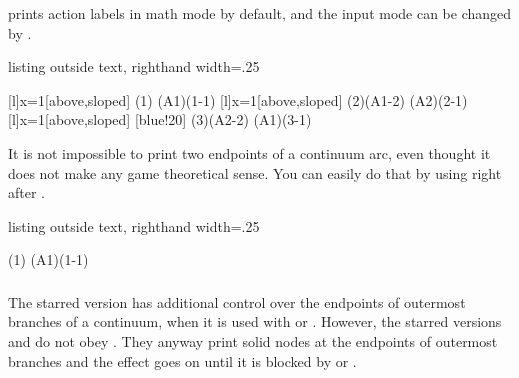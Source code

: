
\cmd{\cntmAistb(*)} prints action labels in math mode by default, and the input mode can be changed by \cmd{\setistmathTF(*)}.

\begin{tcblisting}{listing outside text, righthand width=.25\linewidth}
\begin{istgame}[font=\scriptsize]
\cntmdistance*{10mm}{20mm}
[l]{x=1}[above,sloped]
\istrootcntmA(1)      \istbA        \endist
\istroot(A1)(1-1)    \istbA \istbA  \endist
{}[l]{x=1}[above,sloped]
\istrootcntmA(2)(A1-2) \istb       \endist
\istroot(A2)(2-1)     \istbA \istbA \endist
{}
[l]{x=1}[above,sloped]
[blue!20]
\istrootcntmA(3)(A2-2) \istbA       \endist
\istroot(A1)(3-1)     \istbA \istbA \endist
\end{istgame}
\end{tcblisting}


It is not impossible to print two endpoints of a continuum arc, even thought it does not make any game theoretical sense. You can easily do that by using \icmd{\cntmAexpostShowEndPoints} right after \cmd{\istrootcntmA}.

\begin{tcblisting}{listing outside text, righthand width=.25\linewidth}
\begin{istgame}[font=\scriptsize]
\cntmAistb*
{}
\istrootcntmA(1)        \istbA  \endist
\cntmAexpostShowEndPoints
\istrootcntmA(A1)(1-1)  \istbA*  \endist
{}
\end{istgame}
\end{tcblisting}


\subsubsection{\protect\cmd{\xtShowEndPoints*}}
\label{ssec:xtShowEndPoints*}

The starred version \icmd{\xtShowEndPoints*} has additional control over the endpoints of outermost branches of a continuum, when it is used with \cmd{\cntmistb} or \cmd{\cntmAistb}. 
However, the starred versions \cmd{\cntmistb*} and \cmd{\cntmAistb*} do not obey \cmd{\xtShowEndPoints*}.
They anyway print solid nodes at the endpoints of outermost branches and the effect goes on until it is blocked by \cmd{\xtShowEndPoints*} or \cmd{\xtHidePoints*}.

